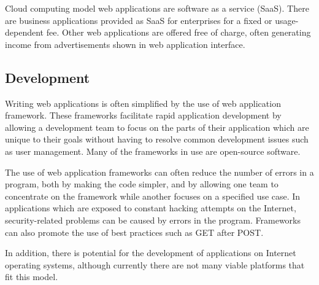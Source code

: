 Cloud computing model web applications are software as a service (SaaS). There are business applications provided as SaaS for enterprises for a fixed or usage-dependent fee. Other web applications are offered free of charge, often generating income from advertisements shown in web application interface\cite{TopTipsSecure}.

\subsection{Development}

Writing web applications is often simplified by the use of web application framework. These frameworks facilitate rapid application development by allowing a development team to focus on the parts of their application which are unique to their goals without having to resolve common development issues such as user management. Many of the frameworks in use are open-source software.

The use of web application frameworks can often reduce the number of errors in a program, both by making the code simpler, and by allowing one team to concentrate on the framework while another focuses on a specified use case. In applications which are exposed to constant hacking attempts on the Internet, security-related problems can be caused by errors in the program. Frameworks can also promote the use of best practices such as GET after POST.

In addition, there is potential for the development of applications on Internet operating systems, although currently there are not many viable platforms that fit this model\cite{FrameworkDocForgeProgramming}.